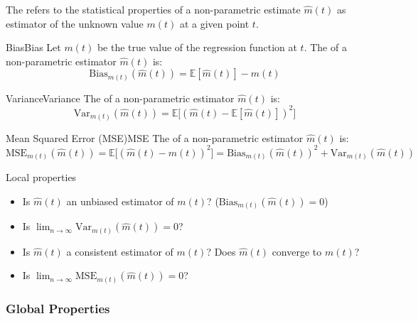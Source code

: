The  refers to the statistical properties of
a non-parametric estimate $\hat m(t)$ as estimator of the unknown
value $m(t)$ at a given point $t$.

\begin{definition}{Bias}{Bias}
    Let $m(t)$ be the true value of the regression function at $t$.
    The  of a non-parametric estimator $\hat m(t)$ is:
    \begin{equation*}
        \text{Bias}_{m(t)}(\hat m(t)) = \mathbb E[\hat m(t)] - m(t)
    \end{equation*}
\end{definition}

\begin{definition}{Variance}{Variance}
    The  of a non-parametric estimator $\hat m(t)$ is:
    \begin{equation*}
        \text{Var}_{m(t)}(\hat m(t)) = \mathbb E\bigl[(\hat m(t) - \mathbb E[\hat m(t)])^2\bigr]
    \end{equation*}
\end{definition}

\begin{definition}{Mean Squared Error (MSE)}{MSE}
    The  of a non-parametric estimator $\hat m(t)$ is:
    \begin{equation*}
        \text{MSE}_{m(t)}(\hat m(t)) = \mathbb E\bigl[(\hat m(t) - m(t))^2\bigr]
        = \text{Bias}_{m(t)}(\hat m(t))^2 + \text{Var}_{m(t)}(\hat m(t))
    \end{equation*}
\end{definition}

\begin{question}{Local properties}{}
    \begin{itemize}
        \item Is $\hat m (t)$ an unbiased estimator of $m(t)$? ($\text{Bias}_{m(t)}(\hat m(t)) = 0$)
        \item Is $\lim_{n\to\infty}\text{Var}_{m(t)}(\hat m(t)) = 0$?
        \item Is $\hat m (t)$ a consistent estimator of $m(t)$? Does $\hat m (t)$ converge to $m(t)$?
        \item Is $\lim_{n\to\infty}\text{MSE}_{m(t)}(\hat m(t)) = 0$?
    \end{itemize}
\end{question}

\subsubsection{Global Properties}

